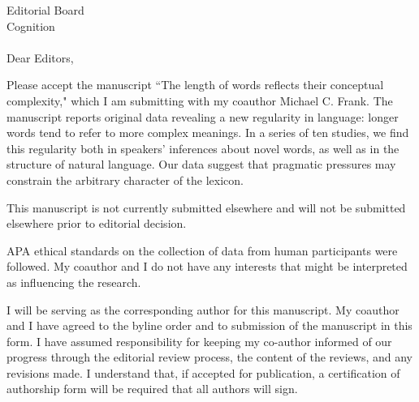 \documentclass{letter}
\begin{document}
\begin{letter}



\opening{Editorial Board\\ 
Cognition\\
\\
Dear Editors,}

Please accept the manuscript ``The length of words reflects their conceptual complexity," which I am submitting with my coauthor Michael C. Frank. The manuscript reports original data revealing a new regularity in language: longer words tend to refer to more complex meanings. In a series of ten studies, we find this regularity both in speakers' inferences about novel words, as well as in the structure of natural language. Our data suggest that pragmatic pressures may constrain the arbitrary character of the lexicon.

This manuscript is not currently submitted elsewhere and will not be submitted elsewhere prior to editorial decision.

APA ethical standards on the collection of data from human participants were followed. My coauthor and I do not have any interests that might be interpreted as influencing the research.

I will be serving as the corresponding author for this manuscript. My coauthor and I have agreed to the byline order and to submission of the manuscript in this form. I have assumed responsibility for keeping my co-author informed of our progress through the editorial review process, the content of the reviews, and any revisions made. I understand that, if accepted for publication, a certification of authorship form will be required that all authors will sign.


\end{letter}
\end{document}
